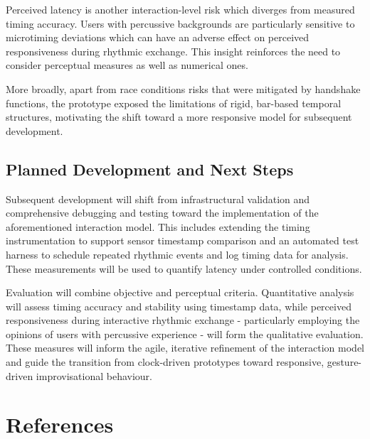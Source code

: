 \documentclass[11pt,a4paper]{article}
\begin{document}
Perceived latency is another interaction-level risk which diverges from measured timing accuracy. Users with percussive backgrounds are particularly sensitive to microtiming deviations which can have an adverse effect on perceived responsiveness during rhythmic exchange. This insight reinforces the need to consider perceptual measures as well as numerical ones. 

More broadly, apart from race conditions risks that were mitigated by handshake functions, the prototype exposed the limitations of rigid, bar-based temporal structures, motivating the shift toward a more responsive model for subsequent development.

\subsection{Planned Development and Next Steps}
Subsequent development will shift from infrastructural validation and comprehensive debugging and testing toward the implementation of the aforementioned interaction model. This includes extending the timing instrumentation to support sensor timestamp comparison and an automated test harness to schedule repeated rhythmic events and log timing data for analysis. These measurements will be used to quantify latency under controlled conditions.

Evaluation will combine objective and perceptual criteria. Quantitative analysis will assess timing accuracy and stability using timestamp data, while perceived responsiveness during interactive rhythmic exchange - particularly employing the opinions of users with percussive experience - will form the qualitative evaluation. These measures will inform the agile, iterative refinement of the interaction model and guide the transition from clock-driven prototypes toward responsive, gesture-driven improvisational behaviour.

\section*{References}
\end{document}
